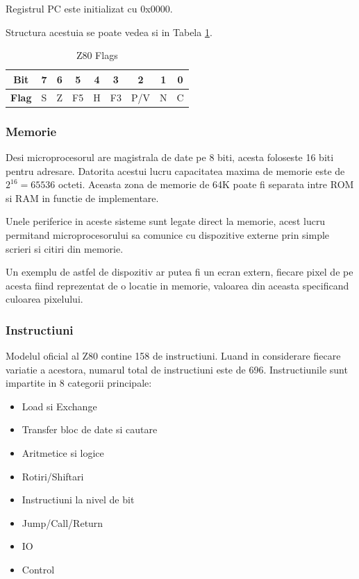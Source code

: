 \documentclass[titlepage,12pt]{article}
\begin{document}
Registrul PC este initializat cu 0x0000.

Structura acestuia se poate vedea si in Tabela \ref{tab:z80flags}.
\begin{table}[h]
    \centering
    \begin{tabular}{|c|c|c|c|c|c|c|c|c|}
    \hline
    \textbf{Bit} & 7 & 6 & 5 & 4 & 3 & 2 & 1 & 0 \\
    \hline
    \textbf{Flag} & S & Z & F5 & H & F3 & P/V & N & C \\
    \hline
    \end{tabular}
    \caption{Z80 Flags}
    \label{tab:z80flags}
\end{table}

\subsubsection{Memorie}

Desi microprocesorul are magistrala de date pe 8 biti, acesta foloseste 16 biti pentru adresare. Datorita acestui lucru capacitatea maxima de memorie este de \(2^{16}=65536\) octeti. Aceasta zona de memorie de 64K poate fi separata intre \ac {ROM} si \ac {RAM} in functie de implementare.

Unele periferice in aceste sisteme sunt legate direct la memorie, acest lucru permitand microprocesorului sa comunice cu dispozitive externe prin simple scrieri si citiri din memorie.

Un exemplu de astfel de dispozitiv ar putea fi un ecran extern, fiecare pixel de pe acesta fiind reprezentat de o locatie in memorie, valoarea din aceasta specificand culoarea pixelului.

\subsubsection{Instructiuni}

Modelul oficial al \ac {Z80} contine 158 de instructiuni. Luand in considerare fiecare variatie a acestora, numarul total de instructiuni este de 696.
Instructiunile sunt impartite in 8 categorii principale:
\begin{itemize}
    \item Load si Exchange
    \item Transfer bloc de date si cautare
    \item Aritmetice si logice
    \item Rotiri/Shiftari
    \item Instructiuni la nivel de bit
    \item Jump/Call/Return
    \item \ac {IO}
    \item Control
\end{itemize}
\end{document}
